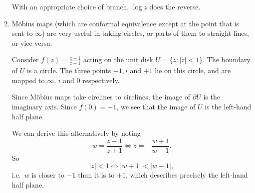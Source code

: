 \documentclass[a4paper]{article}
\begin{document}
\begin{eg}
\begin{enumerate}
\begin{center}
      \end{center}
      With an appropriate choice of branch, $\log z$ does the reverse.
    \item M\"obius maps (which are conformal equivalence except at the point that is sent to $\infty$) are very useful in taking circles, or parts of them to straight lines, or vice versa.

      Consider $f(z) = \frac{z - 1}{z + 1}$ acting on the unit disk $U = \{z: |z| < 1\}$. The boundary of $U$ is a circle. The three points $-1, i$ and $+1$ lie on this circle, and are mapped to $\infty$, $i$ and $0$ respectively.

      Since M\"obius maps take circlines to circlines, the image of $\partial U$ is the imaginary axis. Since $f(0) = -1$, we see that the image of $U$ is the left-hand half plane.
      \begin{center}
      \end{center}
      We can derive this alternatively by noting
      \[
        w = \frac{z - 1}{z + 1} \Leftrightarrow z = -\frac{w + 1}{w - 1}.
      \]
      So
      \[
        |z| < 1 \Leftrightarrow |w + 1| < |w - 1|,
      \]
      i.e.\ $w$ is closer to $-1$ than it is to $+1$, which describes precisely the left-hand half plane.


\end{enumerate}
\end{eg}
\end{document}
